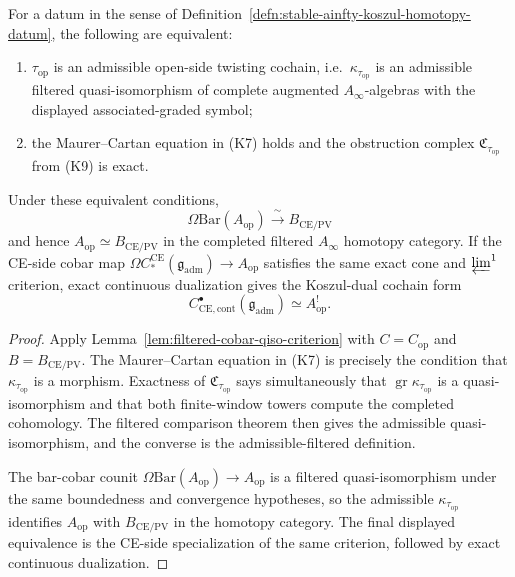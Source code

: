 \documentclass[11pt]{memoir}
\begin{document}
\begin{thm}\label{thm:stable-ainfty-koszul-under-hypotheses}
  For a datum in the sense of
  Definition~\ref{defn:stable-ainfty-koszul-homotopy-datum}, the
  following are equivalent:
  \begin{enumerate}[label=(\alph*)]
    \item \(\tau_{\mathrm{op}}\) is an admissible open-side twisting
      cochain, i.e.\ \(\kappa_{\tau_{\mathrm{op}}}\) is an admissible
      filtered quasi-isomorphism of complete augmented
      \(A_\infty\)-algebras with the displayed associated-graded
      symbol;
    \item the Maurer--Cartan equation in (K7) holds and the
      obstruction complex \(\mathfrak C_{\tau_{\mathrm{op}}}\) from
      (K9) is exact.
  \end{enumerate}
  Under these equivalent conditions,
  \[
    \Omega\mathrm{Bar}(A_{\mathrm{op}})
      \xrightarrow{\ \sim\ }
    B_{\mathrm{CE/PV}}
  \]
  and hence \(A_{\mathrm{op}}\simeq B_{\mathrm{CE/PV}}\) in the
  completed filtered \(A_\infty\) homotopy category.  If the CE-side
	  cobar map
  \(\Omega C_*^{\mathrm{CE}}(\mathfrak g_{\mathrm{adm}})
  \to A_{\mathrm{op}}\) satisfies the same exact cone and
  \(\varprojlim^1\) criterion, exact continuous dualization gives the
  Koszul-dual cochain form
  \[
    C^\bullet_{\mathrm{CE},\mathrm{cont}}(\mathfrak g_{\mathrm{adm}})
      \simeq
    A_{\mathrm{op}}^! .
  \]
\end{thm}

\begin{proof}
  Apply Lemma~\ref{lem:filtered-cobar-qiso-criterion} with
  \(C=C_{\mathrm{op}}\) and \(B=B_{\mathrm{CE/PV}}\).  The
  Maurer--Cartan equation in (K7) is precisely the condition that
  \(\kappa_{\tau_{\mathrm{op}}}\) is a morphism.  Exactness of
  \(\mathfrak C_{\tau_{\mathrm{op}}}\) says simultaneously that
  \(\operatorname{gr}\kappa_{\tau_{\mathrm{op}}}\) is a
  quasi-isomorphism and that both finite-window towers compute the
  completed cohomology.  The filtered comparison theorem then gives
  the admissible quasi-isomorphism, and the converse is the
  admissible-filtered definition.

  The bar-cobar counit
  \(\Omega\mathrm{Bar}(A_{\mathrm{op}})\to A_{\mathrm{op}}\) is a
  filtered quasi-isomorphism under the same boundedness and
  convergence hypotheses, so the admissible
  \(\kappa_{\tau_{\mathrm{op}}}\) identifies \(A_{\mathrm{op}}\) with
  \(B_{\mathrm{CE/PV}}\) in the homotopy category.  The final
  displayed equivalence is the CE-side specialization of the same
  criterion, followed by exact continuous dualization.
\end{proof}
\end{document}
